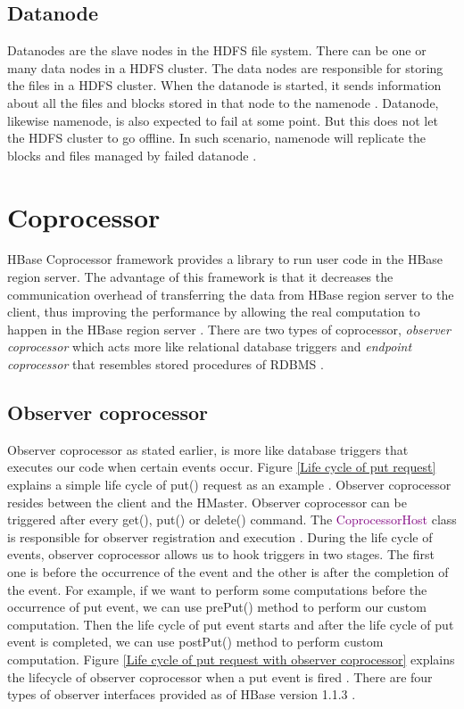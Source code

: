 \documentclass[11pt,a4paper,bibtotoc,idxtotoc,headsepline,footsepline,footexclude,BCOR12mm,DIV13]{scrbook}
\begin{document}
\subsection{Datanode}
\label{DataNode}
Datanodes are the slave nodes in the HDFS file system. There can be one or many data nodes in a HDFS cluster. The data nodes are responsible for storing the files in a HDFS cluster. When the datanode is started, it sends information about all the files and blocks stored in that node to the namenode \cite{HDFS:datanode}. Datanode, likewise namenode, is also expected to fail at some point. But this does not let the HDFS cluster to go offline. In such scenario, namenode will replicate the blocks and files managed by failed datanode \cite{HDFS:namenodeanddatanode}. 


\section{Coprocessor}
\label{sec:coprocessor}

HBase Coprocessor framework provides a library to run user code in the HBase region server. The advantage of this framework is that it decreases the communication overhead of transferring the data from HBase region server to the client, thus improving the performance by allowing the real computation to happen in the HBase region server \cite{coprocessor:coprocessor}. There are two types of coprocessor, \emph{observer coprocessor}  which acts more like relational database triggers and \emph{endpoint coprocessor} that resembles stored procedures of RDBMS \cite{coprocessor:types}. 


\subsection{Observer coprocessor}
\label{sec:observercoprocessor}
Observer coprocessor as stated earlier, is more like database triggers that executes our code when certain events occur. Figure \ref{Life cycle of put request} explains a simple life cycle of put() request as an example \cite{coprocessor:detail}. Observer coprocessor resides between the client and the HMaster. Observer coprocessor can be triggered after every get(), put() or delete() command. The \textcolor{purple} {CoprocessorHost} class is responsible for observer registration and execution \cite{coprocessor:detail}.  During the life cycle of events, observer coprocessor allows us to hook triggers in two stages. The first one is before the occurrence of the event and the other is after the completion of the event. For example, if we want to perform some computations before the occurrence of put event, we can use prePut() method to perform our custom computation. Then the life cycle of put event starts and after the life cycle of put event is completed, we can use postPut() method to perform custom computation. Figure \ref{Life cycle of put request with observer coprocessor} explains the lifecycle of observer coprocessor when a put event is fired \cite{coprocessor:detail}.
\newline
There are four types of observer interfaces provided as of HBase version 1.1.3 \cite{hbase:essential}.
\end{document}
